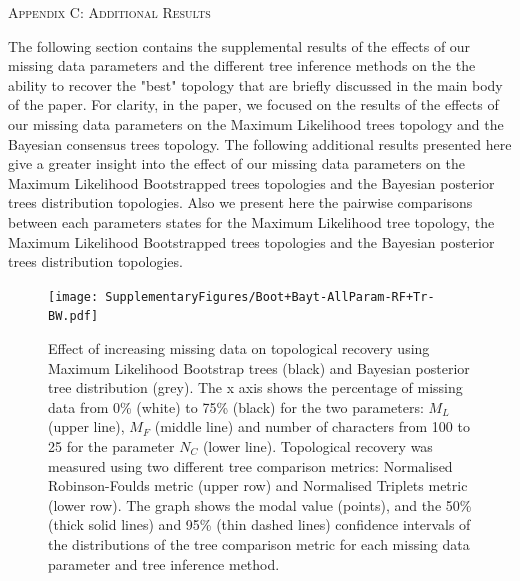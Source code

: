 \documentclass[12pt,letterpaper]{article}
\renewcommand{\section}[1]{%
\bigskip
\begin{center}
\begin{Large}
\normalfont\scshape #1
\medskip
\end{Large}
\end{center}}
\begin{document}
\section{Appendix C: Additional Results}

The following section contains the supplemental results of the effects of our missing data parameters and the different tree inference methods on the the ability to recover the "best" topology that are briefly discussed in the main body of the paper. For clarity, in the paper, we focused on the results of the effects of our missing data parameters on the Maximum Likelihood trees topology and the Bayesian consensus trees topology. The following additional results presented here give a greater insight into the effect of our missing data parameters on the Maximum Likelihood Bootstrapped trees topologies and the Bayesian posterior trees distribution topologies. Also we present here the pairwise comparisons between each parameters states for the Maximum Likelihood tree topology, the Maximum Likelihood Bootstrapped trees topologies and the Bayesian posterior trees distribution topologies.

\begin{figure} 
\centering
    \texttt{[image: SupplementaryFigures/Boot+Bayt-AllParam-RF+Tr-BW.pdf]}
    \caption{Effect of increasing missing data on topological recovery using Maximum Likelihood Bootstrap trees (black) and Bayesian posterior tree distribution (grey). The x axis shows the percentage of missing data from 0\% (white) to 75\% (black) for the two parameters: $M_{L}$ (upper line), $M_{F}$ (middle line) and number of characters from 100 to 25 for the parameter $N_{C}$ (lower line). Topological recovery was measured using two different tree comparison metrics: Normalised Robinson-Foulds metric (upper row) and Normalised Triplets metric (lower row). The graph shows the modal value (points), and the 50\% (thick solid lines) and 95\% (thin dashed lines) confidence intervals of the distributions of the tree comparison metric for each missing data parameter and tree inference method.} 
\label{Fig_Supp_BootBayt_allparam} 
\end{figure}
\end{document}
